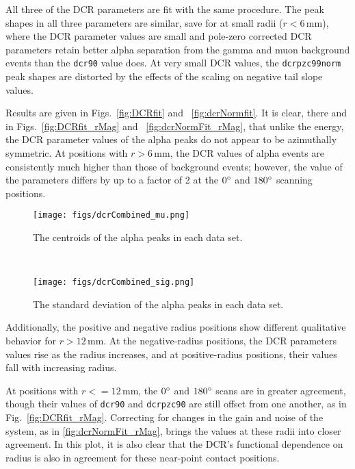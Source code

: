\documentclass[groupedaddress,rmp,amsmath,amssymb,bibnotes,altaffilletter,twocolumn]{revtex4-1}
\begin{document}
All three of the DCR parameters are fit with the same procedure. The peak shapes in all three parameters are similar, save for at small radii ($r<6$\,mm), where the DCR parameter values are small and pole-zero corrected DCR parameters retain better alpha separation from the gamma and muon background events than the {\tt dcr90} value does. At very small DCR values, the {\tt dcrpzc99norm} peak shapes are distorted by the effects of the scaling on negative tail slope values. 

Results are given in Figs.~\ref{fig:DCRfit} and ~\ref{fig:dcrNormfit}. It is clear, there and in Figs.~\ref{fig:DCRfit_rMag} and ~\ref{fig:dcrNormFit_rMag}, that unlike the energy, the DCR parameter values of the alpha peaks do not appear to be azimuthally symmetric. At positions with $r>6$\,mm, the DCR values of alpha events are consistently much higher than those of background events; however, the value of the parameters differs by up to a factor of 2 at the $0\degree$ and $180\degree$ scanning positions. 

\begin{figure*}[]
 \centering
  \begin{subfigure}[]{.45\textwidth}
 \texttt{[image: figs/dcrCombined\_mu.png]}
 \caption{The centroids of the alpha peaks in each data set.} 
 \label{fig:DCRfit_mu}
\end{subfigure}
~
\begin{subfigure}[]{.45\textwidth}
 \texttt{[image: figs/dcrCombined\_sig.png]}
 \caption{The standard deviation of the alpha peaks in each data set.} 
 \label{fig:DCRfit_sig}
 \end{subfigure}
 \caption{The results of Gaussian fits to the alpha peaks in {\tt dcrpzc90}, in black, and {\tt dcr90}, in blue. All values are in units of ADC/ns. The hashed box indicates the region on the detector surface that is obscured by the contact pin and contact pin support.}
  \label{fig:DCRfit}
\end{figure*}

Additionally, the positive and negative radius positions show different qualitative behavior for $r>12$\,mm. At the negative-radius positions, the DCR parameters values rise as the radius increases, and at positive-radius positions, their values fall with increasing radius. 

At positions with $r<= 12$\,mm, the $0\degree$ and $180\degree$ scans are in greater agreement, though their values of {\tt dcr90} and {\tt dcrpzc90} are still offset from one another, as in Fig.~\ref{fig:DCRfit_rMag}. Correcting for changes in the gain and noise of the system, as in \ref{fig:dcrNormFit_rMag}, brings the values at these radii into closer agreement. In this plot, it is also clear that the DCR's functional dependence on radius is also in agreement for these near-point contact positions. 
\end{document}

